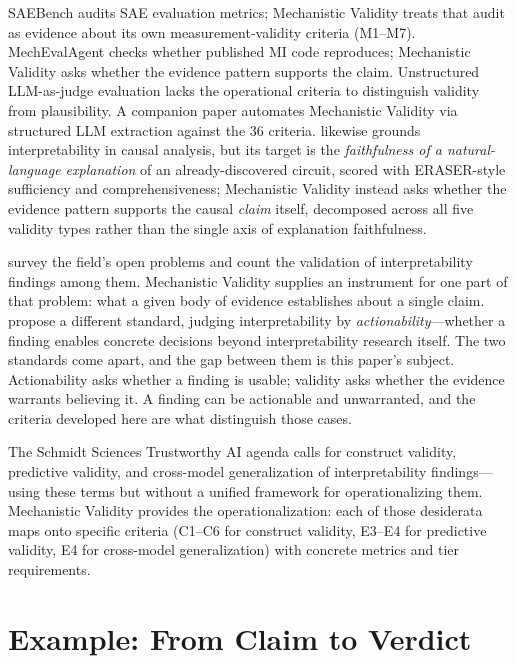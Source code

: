 \documentclass{article}
\begin{document}
SAEBench \citep{karvonen2025saebench} audits SAE evaluation metrics; Mechanistic Validity treats that audit as evidence about its own measurement-validity criteria (M1--M7). MechEvalAgent \citep{bai2026mecheval} checks whether published MI code reproduces; Mechanistic Validity asks whether the evidence pattern supports the claim. Unstructured LLM-as-judge evaluation \citep{zheng2023judging} lacks the operational criteria to distinguish validity from plausibility. A companion paper automates Mechanistic Validity via structured LLM extraction against the 36 criteria. \citet{mahale2026causally} likewise grounds interpretability in causal analysis, but its target is the \emph{faithfulness of a natural-language explanation} of an already-discovered circuit, scored with ERASER-style sufficiency and comprehensiveness; Mechanistic Validity instead asks whether the evidence pattern supports the causal \emph{claim} itself, decomposed across all five validity types rather than the single axis of explanation faithfulness.

\citet{sharkey2025open} survey the field's open problems and count the validation of interpretability findings among them. Mechanistic Validity supplies an instrument for one part of that problem: what a given body of evidence establishes about a single claim. \citet{orgad2026actionable} propose a different standard, judging interpretability by \emph{actionability}---whether a finding enables concrete decisions beyond interpretability research itself. The two standards come apart, and the gap between them is this paper's subject. Actionability asks whether a finding is usable; validity asks whether the evidence warrants believing it. A finding can be actionable and unwarranted, and the criteria developed here are what distinguish those cases.

The Schmidt Sciences Trustworthy AI agenda \citep{schmidt2026trustworthy} calls for construct validity, predictive validity, and cross-model generalization of interpretability findings---using these terms but without a unified framework for operationalizing them. Mechanistic Validity provides the operationalization: each of those desiderata maps onto specific criteria (C1--C6 for construct validity, E3--E4 for predictive validity, E4 for cross-model generalization) with concrete metrics and tier requirements.

\section{Example: From Claim to Verdict}
\label{sec:overview}
\end{document}
